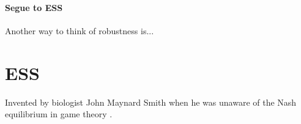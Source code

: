 \subsubsection{Segue to ESS}
Another way to think of robustness is...


\chapter{ESS}
Invented by biologist John Maynard Smith when he was unaware of the Nash equilibrium in game theory \cite[p.53]{nowak2006evolutionary}.






